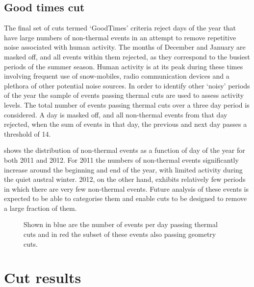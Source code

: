 \subsection{Good times cut}
\label{sec:Analysis:Anthropogenic-Cuts:Good-Times}
The final set of cuts termed `GoodTimes' criteria reject days of the year that have large numbers of non-thermal events in an attempt to remove repetitive noise associated with human activity. The months of December and January are masked off, and all events within them rejected, as they correspond to the busiest periods of the summer season. Human activity is at its peak during these times involving frequent use of snow-mobiles, radio communication devices and a plethora of other potential noise sources. In order to identify other `noisy' periods of the year the sample of events passing thermal cuts are used to assess activity levels. The total number of events passing thermal cuts over a three day period is considered. A day is masked off, and all non-thermal events from that day rejected, when the sum of events in that day, the previous and next day passes a threshold of 14. 

 shows the distribution of non-thermal events as a function of day of the year for both 2011 and 2012. For 2011 the numbers of non-thermal events significantly increase around the beginning and end of the year, with limited activity during the quiet austral winter. 2012, on the other hand, exhibits relatively few periods in which there are very few non-thermal events. Future analysis of these events is expected to be able to categorise them and enable cuts to be designed to remove a large fraction of them.

\begin{figure}[htpb]
\hfill
{}
\caption{Shown in blue are the number of events per day passing thermal cuts and in red the subset of these events also passing geometry cuts.}
\label{fig:Analysis:Anthropogenic-Cuts:GoodTimes:Event-Rate}
\end{figure}

\section{Cut results}
\label{sec:Analysis:Cut-Results}

